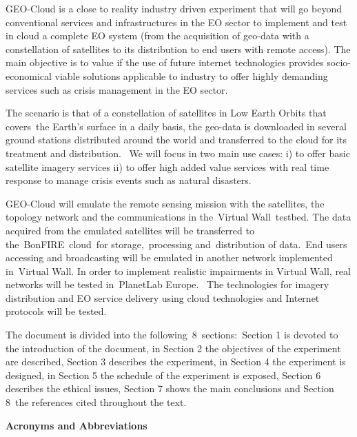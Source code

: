 \documentclass[a4paper]{article}
\begin{document}
\bigskip

GEO-Cloud is a close to reality industry driven experiment that will go
beyond conventional services and infrastructures in the EO sector to
implement and test in cloud a complete EO system (from the acquisition
of geo-data with a constellation of satellites to its distribution to
end users with remote access). The main objective is to value if the
use of future internet technologies provides socio-economical viable
solutions applicable to industry to offer highly demanding services
such as crisis management in the EO sector.


\bigskip

The scenario is that of a constellation of satellites in Low Earth
Orbits that covers\ the Earth{\textquoteright}s surface in a daily
basis, the geo-data is downloaded in several ground stations
distributed around the world and transferred to the cloud for its
treatment and distribution. \ We will focus in two main use cases: i)
to offer basic satellite imagery services ii) to offer high added value
services with real time response to manage crisis events such as
natural disasters.\ 


\bigskip

GEO-Cloud will emulate the remote sensing mission with the satellites,
the topology network and the communications in the\ Virtual
Wall\ testbed. The data acquired from the emulated satellites will be
transferred to the\ BonFIRE\ cloud\ for storage,\ processing
and\ distribution of data.\ End users accessing and broadcasting will
be emulated in another network implemented in\ Virtual Wall. In order
to implement realistic impairments in Virtual Wall, real networks will
be tested in\ PlanetLab Europe. \ The technologies for imagery
distribution and EO service delivery using cloud technologies and
Internet protocols will be tested.


\bigskip

The document is divided into the following\ 8\ sections:\ Section 1 is
devoted to the introduction of the document, in Section 2 the
objectives of the experiment are described, Section 3 describes the
experiment, in Section 4 the experiment is designed, in Section 5 the
schedule of the experiment is exposed, Section 6 describes the ethical
issues, Section 7 shows the main conclusions and Section 8\ the
references cited throughout the text.

\clearpage
\textrm{\textbf{A}}\textrm{\textbf{cronyms and
A}}\textrm{\textbf{bbreviations}}
\end{document}
